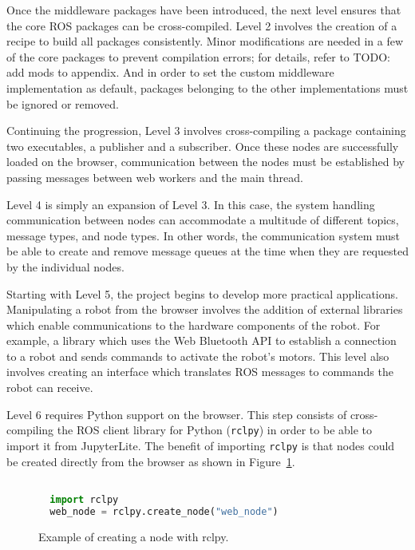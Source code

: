         Once the middleware packages have been introduced, the next level ensures that the core \ac{ROS} packages can be cross-compiled. Level 2 involves the creation of a recipe to build all packages consistently. Minor modifications are needed in a few of the core packages to prevent compilation errors; for details, refer to TODO: add mods to appendix. And in order to set the custom middleware implementation as default, packages belonging to the other implementations must be ignored or removed. 

        Continuing the progression, Level 3 involves cross-compiling a package containing two executables, a publisher and a subscriber. Once these nodes are successfully loaded on the browser, communication between the nodes must be established by passing messages between web workers and the main thread.

        Level 4 is simply an expansion of Level 3. In this case, the system handling communication between nodes can accommodate a multitude of different topics, message types, and node types. In other words, the communication system must be able to create and remove message queues at the time when they are requested by the individual nodes.

        Starting with Level 5, the project begins to develop more practical applications. Manipulating a robot from the browser involves the addition of external libraries which enable communications to the hardware components of the robot. For example, a library which uses the Web Bluetooth \ac{API} to establish a connection to a robot and sends commands to activate the robot's motors. This level also involves creating an interface which translates \ac{ROS} messages to commands the robot can receive.

        Level 6 requires Python support on the browser. This step consists of cross-compiling the \ac{ROS} client library for Python (\texttt{rclpy}) in order to be able to import it from JupyterLite. The benefit of importing \texttt{rclpy} is that nodes could be created directly from the browser as shown in Figure~\ref{fig:rclpy}. 

        \begin{figure}[htbp]
            \centering
            \begin{lstlisting}[language=Python]

  import rclpy
  web_node = rclpy.create_node("web_node")
            \end{lstlisting}
            \caption{Example of creating a node with \textsf{rclpy}.}
            \label{fig:rclpy}
        \end{figure}

